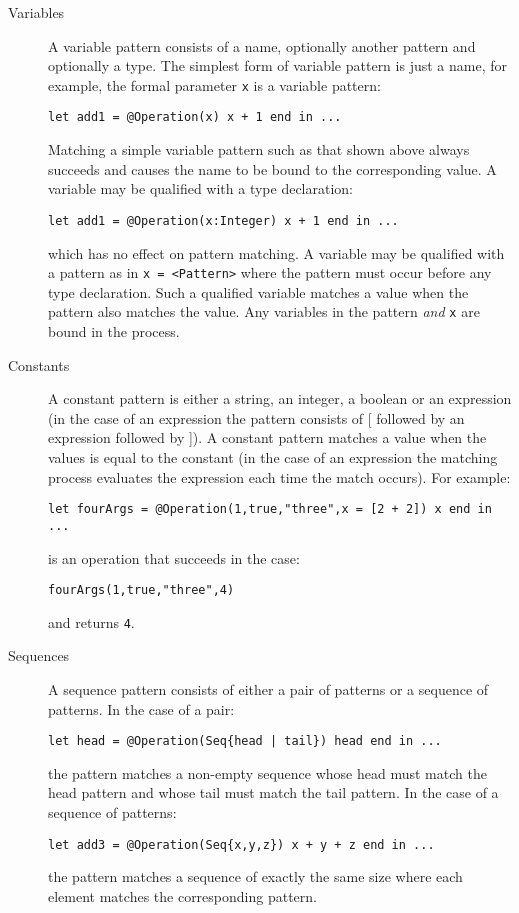 \documentclass{article}
\begin{document}
\begin{description}

\item[Variables]
A variable pattern consists of a name, optionally another pattern and optionally a type.
The simplest form of variable pattern is just a name, for example, the formal parameter
{\tt x} is a variable pattern:
\begin{verbatim}
let add1 = @Operation(x) x + 1 end in ...
\end{verbatim}
Matching a simple variable pattern such as that shown above always succeeds and causes
the name to be bound to the corresponding value. A variable may be qualified with a type
declaration:
\begin{verbatim}
let add1 = @Operation(x:Integer) x + 1 end in ...
\end{verbatim}
which has no effect on pattern matching. A variable may be qualified with a pattern as in
{\tt x = <Pattern>} where the pattern must occur before any type declaration. Such a 
qualified variable matches a value when the pattern also matches the value. Any variables 
in the pattern {\em and} {\tt x} are bound in the process.

\item[Constants]
A constant pattern is either a string, an integer, a boolean or an expression 
(in the case of an expression the pattern consists of [ followed by an expression
followed by ]). A constant pattern matches a value when the values is equal to the 
constant (in the case of an expression the matching process evaluates the expression 
each time the match occurs). For example:
\begin{verbatim}
let fourArgs = @Operation(1,true,"three",x = [2 + 2]) x end in ...
\end{verbatim}
is an operation that succeeds in the case:
\begin{verbatim}
fourArgs(1,true,"three",4)
\end{verbatim}
and returns {\tt 4}.

\item[Sequences]
A sequence pattern consists of either a pair of patterns or a sequence of patterns. 
In the case of a pair:
\begin{verbatim}
let head = @Operation(Seq{head | tail}) head end in ...
\end{verbatim}
the pattern matches a non-empty sequence whose head must match the head pattern and
whose tail must match the tail pattern. In the case of a sequence of patterns:
\begin{verbatim}
let add3 = @Operation(Seq{x,y,z}) x + y + z end in ...
\end{verbatim}
the pattern matches a sequence of exactly the same size where each element matches
the corresponding pattern.


\end{description}
\end{document}
